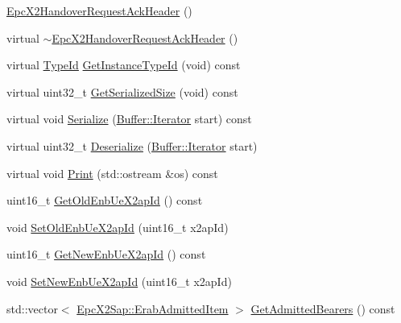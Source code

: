 \begin{DoxyCompactItemize}
\item 
\hyperlink{classns3_1_1EpcX2HandoverRequestAckHeader_aa063d437bff9df10560bad46be9391f1}{Epc\+X2\+Handover\+Request\+Ack\+Header} ()
\item 
virtual \hyperlink{classns3_1_1EpcX2HandoverRequestAckHeader_add96f23fcdd3ba09e4895b91d3c12252}{$\sim$\+Epc\+X2\+Handover\+Request\+Ack\+Header} ()
\item 
virtual \hyperlink{classns3_1_1TypeId}{Type\+Id} \hyperlink{classns3_1_1EpcX2HandoverRequestAckHeader_a85505df33349ebb21d5956358cec1e07}{Get\+Instance\+Type\+Id} (void) const 
\item 
virtual uint32\+\_\+t \hyperlink{classns3_1_1EpcX2HandoverRequestAckHeader_af114c3564ad6c3ae34ed22ff2fafe77d}{Get\+Serialized\+Size} (void) const 
\item 
virtual void \hyperlink{classns3_1_1EpcX2HandoverRequestAckHeader_a8b9db63af1bbf23c0ec784a864431196}{Serialize} (\hyperlink{classns3_1_1Buffer_1_1Iterator}{Buffer\+::\+Iterator} start) const 
\item 
virtual uint32\+\_\+t \hyperlink{classns3_1_1EpcX2HandoverRequestAckHeader_afe8f61bd8a812f1bf6ab20706c409923}{Deserialize} (\hyperlink{classns3_1_1Buffer_1_1Iterator}{Buffer\+::\+Iterator} start)
\item 
virtual void \hyperlink{classns3_1_1EpcX2HandoverRequestAckHeader_a102800ef05c380fed57344e3f0ff5ecb}{Print} (std\+::ostream \&os) const 
\item 
uint16\+\_\+t \hyperlink{classns3_1_1EpcX2HandoverRequestAckHeader_a0fdb44255f2a315de15b12e8ba425e3b}{Get\+Old\+Enb\+Ue\+X2ap\+Id} () const 
\item 
void \hyperlink{classns3_1_1EpcX2HandoverRequestAckHeader_ab9059f9c8303d76c582f907407e28766}{Set\+Old\+Enb\+Ue\+X2ap\+Id} (uint16\+\_\+t x2ap\+Id)
\item 
uint16\+\_\+t \hyperlink{classns3_1_1EpcX2HandoverRequestAckHeader_ad80029fab234e15bd5dae593fa1decb6}{Get\+New\+Enb\+Ue\+X2ap\+Id} () const 
\item 
void \hyperlink{classns3_1_1EpcX2HandoverRequestAckHeader_aaa4c94049bfa2f82c75647697720aad9}{Set\+New\+Enb\+Ue\+X2ap\+Id} (uint16\+\_\+t x2ap\+Id)
\item 
std\+::vector$<$ \hyperlink{structns3_1_1EpcX2Sap_1_1ErabAdmittedItem}{Epc\+X2\+Sap\+::\+Erab\+Admitted\+Item} $>$ \hyperlink{classns3_1_1EpcX2HandoverRequestAckHeader_aeb517c5a65da4a3a9030194762d35323}{Get\+Admitted\+Bearers} () const 
\item 

\end{DoxyCompactItemize}
